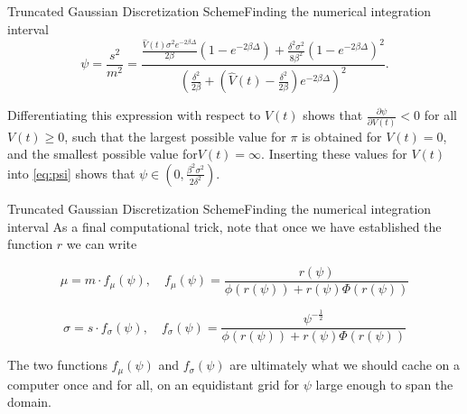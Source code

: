     \begin{frame}{Truncated Gaussian Discretization Scheme}{Finding the numerical integration interval}
        \begin{equation}\label{eq:psi}
            \psi = \frac{s^2}{m^2} = \frac{\frac{\hat{V}(t)\sigma^2e^{-2\beta \Delta}}{2\beta}\left(1 - e^{-2\beta \Delta}\right) + \frac{\delta^2\sigma^2}{8\beta^2}\left(1 - e^{-2\beta \Delta}\right)^2}{(\frac{\delta^2}{2\beta} + \left(\hat{V}(t) - \frac{\delta^2}{2\beta}\right)e^{-2\beta \Delta})^2}.
        \end{equation}

        Differentiating this expression with respect to $V(t)$ shows that $\frac{\partial\psi}{\partial V(t)}<0$ for all $V(t)\geq 0$, such that the largest possible value for $\pi$ is 
        obtained for $V(t)=0$, and the smallest possible value for$V(t)=\infty$. Inserting these values for $V(t)$ into \eqref{eq:psi} shows that $\psi \in (0, \frac{\beta^2\sigma^2}{2\delta^2})$.
    \end{frame}

    \begin{frame}{Truncated Gaussian Discretization Scheme}{Finding the numerical integration interval}
        As a final computational trick, note that once we have established the function $r$ we can write
        
        \begin{equation}
        \mu = m\cdot f_\mu(\psi), \quad f_\mu(\psi)= \frac{r(\psi)}{\phi(r(\psi)) + r(\psi)\Phi(r(\psi))}
        \end{equation}

        \begin{equation}
        \sigma = s\cdot f_\sigma(\psi), \quad f_\sigma(\psi)= \frac{\psi^{-\frac{1}{2}}}{\phi(r(\psi)) + r(\psi)\Phi(r(\psi))}
        \end{equation}

        The two functions $f_\mu(\psi)$ and $f_\sigma(\psi)$ are ultimately what we should cache on a computer once and for all, on an equidistant grid for $\psi$ large enough to span the domain.
    \end{frame}
